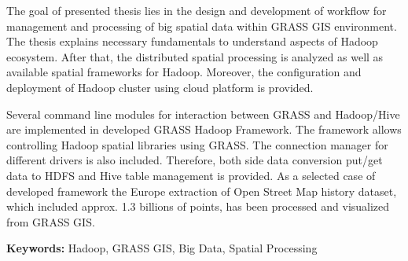 \documentclass[a4paper,12pt,oneside]{report}
\author{Matěj Krejčí}
\newenvironment{abstractpage}
{\cleardoublepage\vspace*{\fill}\thispagestyle{empty}}
{\vfill\cleardoublepage}
\newenvironment{abstractx}[1]
{\bigskip\selectlanguage{#1}%
	\begin{center}\bfseries\abstractname\end{center}}
{\par\bigskip}
\newcommand{\klicslova}[2]{\noindent\textbf{#1: }#2}
\begin{document}
	\pagestyle{empty}
	
	\renewcommand*\listfigurename{List of figures}
	 
	\renewcommand*\listtablename{List of  Tables}
	
	\renewcommand{\bibname}{References}
	\renewcommand{\contentsname}{Content}
	\renewcommand{\figurename}{Fig.}
	\renewcommand{\tablename}{Tab.}
	
	
	
	
	\renewcommand\footnotelayout{\footnotesize}
	
	
	
	\newpage
	
	\newpage
	\begin{abstractpage}
		\begin{abstractx}{english}
			
         The goal of presented thesis lies in the design and development of workflow for management and
          processing of big spatial data within GRASS GIS environment. The thesis explains necessary
           fundamentals to understand aspects of Hadoop ecosystem. After that, the distributed spatial
            processing is analyzed as well as available spatial frameworks for Hadoop. Moreover, the
             configuration and deployment of Hadoop cluster using cloud platform is provided.
		                               
		                               
		                               
          Several command line modules for interaction between GRASS and Hadoop/Hive are implemented in
           developed GRASS Hadoop Framework. The framework allows controlling Hadoop spatial libraries using
            GRASS. The connection manager for different drivers is also included. Therefore, both side data
             conversion put/get data to HDFS and Hive table management is provided. As a selected case of
              developed framework the Europe extraction of Open Street Map history dataset, which included
               approx. 1.3 billions of points, has been processed and visualized from GRASS GIS.
			
			\klicslova{Keywords}{Hadoop, GRASS GIS, Big Data, Spatial Processing}
		\end{abstractx}
	\end{abstractpage}
	
\end{document}
